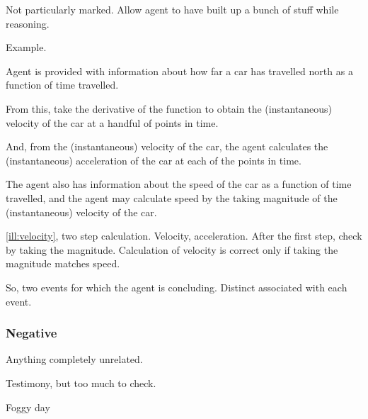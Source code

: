 \begin{note}
  Not particularly marked.
  Allow agent to have built up a bunch of stuff while reasoning.

  Example.

  \begin{scenario}[Velocity]
    \label{ill:velocity}
    Agent is provided with information about how far a car has travelled north as a function of time travelled.

    From this, take the derivative of the function to obtain the (instantaneous) velocity of the car at a handful of points in time.

    And, from the (instantaneous) velocity of the car, the agent calculates the (instantaneous) acceleration of the car at each of the points in time.

    The agent also has information about the speed of the car as a function of time travelled, and the agent may calculate speed by the taking magnitude of the (instantaneous) velocity of the car.
  \end{scenario}

  \autoref{ill:velocity}, two step calculation.
  Velocity, acceleration.
  After the first step, check by taking the magnitude.
  Calculation of velocity is correct only if taking the magnitude matches speed.

  So, two events for which the agent is concluding.
  Distinct  associated with each event.
\end{note}

\subsubsection{Negative}
\label{sec:negative}

\begin{note}
  Anything completely unrelated.
\end{note}

\begin{note}
  Testimony, but too much to check.
\end{note}

\begin{note}
  Foggy day
\end{note}

